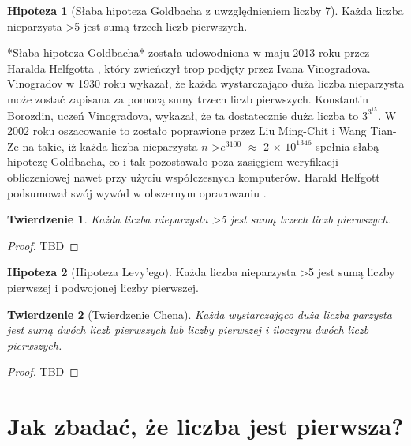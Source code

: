\documentclass[10pt,onecolumn]{article}
\newtheorem{theorem}{Twierdzenie}
\theoremstyle{definition}
\theoremstyle{hypothesis}
\newtheorem{hypothesis}{Hipoteza}
\theoremstyle{capability}
\begin{document}
\begin{hypothesis}[Słaba hipoteza Goldbacha z uwzględnieniem liczby 7]
Każda liczba nieparzysta \textgreater 5 jest sumą trzech liczb pierwszych.
\label{Goldbach_weak_hyp_with_seven}
\end{hypothesis}

*Słaba hipoteza Goldbacha* została udowodniona w maju 2013 roku przez Haralda Helfgotta \cite{helfgott2013}, który zwieńczył trop podjęty przez Ivana Vinogradova. Vinogradov w 1930 roku wykazał, że każda wystarczająco duża liczba nieparzysta może zostać zapisana za pomocą sumy trzech liczb pierwszych. Konstantin Borozdin, uczeń Vinogradova, wykazał, że ta dostatecznie duża liczba to $3^{3^{15}}$. W 2002 roku oszacowanie to zostało poprawione przez Liu Ming-Chit i Wang Tian-Ze na takie, iż każda liczba nieparzysta $n$ \textgreater $e^{3100}$  $\approx$ 2 $\times$ $10^{1346}$ spełnia słabą hipotezę Goldbacha, co i tak pozostawało poza zasięgiem weryfikacji obliczeniowej nawet przy użyciu współczesnych komputerów. Harald Helfgott podsumował swój wywód w obszernym opracowaniu \cite{helfgott2015}.

\begin{theorem}
Każda liczba nieparzysta \textgreater 5 jest sumą trzech liczb pierwszych.
\end{theorem}
\begin{proof}
TBD
\end{proof}

\begin{hypothesis}[Hipoteza Levy'ego]
Każda liczba nieparzysta \textgreater 5 jest sumą liczby pierwszej i podwojonej liczby pierwszej.
\label{Levy_hyp}
\end{hypothesis}

\begin{theorem}[Twierdzenie Chena]
Każda wystarczająco duża liczba parzysta jest sumą dwóch liczb pierwszych lub liczby pierwszej i iloczynu dwóch liczb pierwszych.
\end{theorem}
\begin{proof}
TBD
\end{proof}

\newpage


\section{Jak zbadać, że liczba jest pierwsza?}
\end{document}
